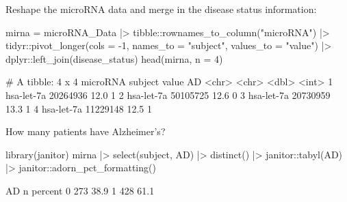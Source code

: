 \documentclass[a4paper]{article}\usepackage[]{graphicx}\usepackage[]{xcolor}
\begin{document}
Reshape the microRNA data and merge in the disease status information:
\begin{Schunk}
\begin{Sinput}
mirna = microRNA_Data |>
  tibble::rownames_to_column("microRNA") |> 
  tidyr::pivot_longer(cols = -1, names_to = "subject", values_to = "value") |> 
  dplyr::left_join(disease_status)
head(mirna, n = 4)
\end{Sinput}
\begin{Soutput}
# A tibble: 4 x 4
  microRNA   subject  value    AD
  <chr>      <chr>    <dbl> <int>
1 hsa-let-7a 20264936  12.0     1
2 hsa-let-7a 50105725  12.6     0
3 hsa-let-7a 20730959  13.3     1
4 hsa-let-7a 11229148  12.5     1
\end{Soutput}
\end{Schunk}
How many patients have Alzheimer's?
\begin{Schunk}
\begin{Sinput}
library(janitor)
mirna |> select(subject, AD) |> 
  distinct() |> 
  janitor::tabyl(AD) |> 
  janitor::adorn_pct_formatting()
\end{Sinput}
\begin{Soutput}
 AD   n percent
  0 273   38.9%
  1 428   61.1%
\end{Soutput}
\end{Schunk}
\end{document}
